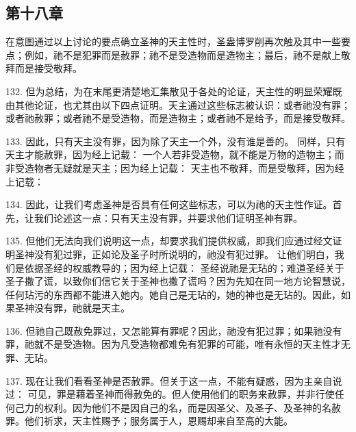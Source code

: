 
\subsection{第十八章}

在意图通过以上讨论的要点确立圣神的天主性时，圣盎博罗削再次触及其中一些要点；例如，祂不是犯罪而是赦罪；祂不是受造物而是造物主；最后，祂不是献上敬拜而是接受敬拜。\par

132. 但为总结，为在末尾更清楚地汇集散见于各处的论证，天主性的明显荣耀既由其他论证，也尤其由以下四点证明。天主通过这些标志被认识：或者祂没有罪；或者祂赦罪；或者祂不是受造物，而是造物主；或者祂不是给予，而是接受敬拜。\par

133. 因此，只有天主没有罪，因为除了天主一个外，没有谁是善的。 同样，只有天主才能赦罪，因为经上记载：  一个人若非受造物，就不能是万物的造物主；而非受造物者无疑就是天主；因为经上记载：  天主也不敬拜，而是受敬拜，因为经上记载： \par

134. 因此，让我们考虑圣神是否具有任何这些标志，可以为祂的天主性作证。首先，让我们论述这一点：只有天主没有罪，并要求他们证明圣神有罪。\par

135. 但他们无法向我们说明这一点，却要求我们提供权威，即我们应通过经文证明圣神没有犯过罪，正如论及圣子时所说明的，祂没有犯过罪。 让他们明白，我们是依据圣经的权威教导的；因为经上记载：  圣经说祂是无玷的；难道圣经关于圣子撒了谎，以致你们信它关于圣神也撒了谎吗？因为先知在同一地方论智慧说，任何玷污的东西都不能进入她内。她自己是无玷的，她的神也是无玷的。因此，如果圣神没有罪，祂就是天主。\par

136. 但祂自己既赦免罪过，又怎能算有罪呢？因此，祂没有犯过罪；如果祂没有罪，祂就不是受造物。因为凡受造物都难免有犯罪的可能，唯有永恒的天主性才无罪、无玷。\par

137. 现在让我们看看圣神是否赦罪。但关于这一点，不能有疑惑，因为主亲自说过：  可见，罪是藉着圣神而得赦免的。但人使用他们的职务来赦罪，并非行使任何己力的权利。因为他们不是因自己的名，而是因圣父、及圣子、及圣神的名赦罪。他们祈求，天主性赐予；服务属于人，恩赐却来自至高的大能。\par

